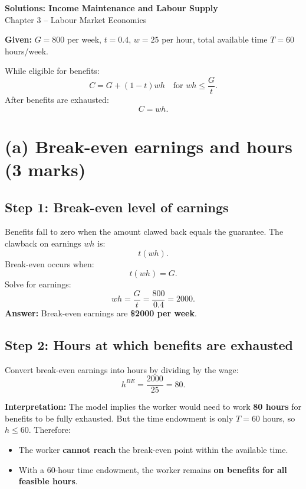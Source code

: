 \documentclass[12pt]{article}
\begin{document}
\begin{center}
{\Large \textbf{Solutions: Income Maintenance and Labour Supply}}\\
Chapter 3 -- Labour Market Economics
\end{center}

\vspace{1em}

\textbf{Given:} $G=800$ per week, $t=0.4$, $w=25$ per hour, total available time $T=60$ hours/week.

While eligible for benefits:
\[
C = G + (1-t)wh
\quad \text{for } wh \leq \frac{G}{t}.
\]
After benefits are exhausted:
\[
C = wh.
\]

\section*{(a) Break-even earnings and hours (3 marks)}

\subsection*{Step 1: Break-even level of earnings}

Benefits fall to zero when the amount clawed back equals the guarantee.  
The clawback on earnings $wh$ is:
\[
t(wh).
\]
Break-even occurs when:
\[
t(wh) = G.
\]
Solve for earnings:
\[
wh = \frac{G}{t} = \frac{800}{0.4} = 2000.
\]
\textbf{Answer:} Break-even earnings are \textbf{\$2000 per week}.

\subsection*{Step 2: Hours at which benefits are exhausted}

Convert break-even earnings into hours by dividing by the wage:
\[
h^{BE} = \frac{2000}{25} = 80.
\]

\textbf{Interpretation:} The model implies the worker would need to work \textbf{80 hours} for benefits to be fully exhausted.  
But the time endowment is only $T=60$ hours, so $h \le 60$. Therefore:

\begin{itemize}
\item The worker \textbf{cannot reach} the break-even point within the available time.
\item With a 60-hour time endowment, the worker remains \textbf{on benefits for all feasible hours}.
\end{itemize}
\end{document}
